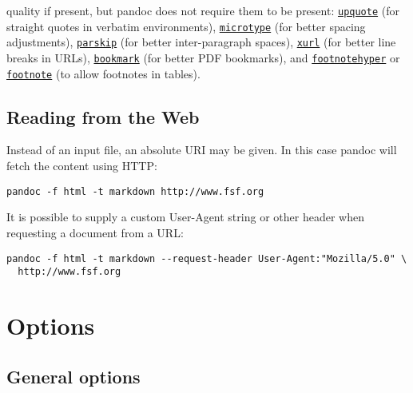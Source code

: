 \documentclass[
]{article}
\begin{document}
quality if present, but pandoc does not require them to be present:
\href{https://ctan.org/pkg/upquote}{\texttt{upquote}} (for straight
quotes in verbatim environments),
\href{https://ctan.org/pkg/microtype}{\texttt{microtype}} (for better
spacing adjustments),
\href{https://ctan.org/pkg/parskip}{\texttt{parskip}} (for better
inter-paragraph spaces), \href{https://ctan.org/pkg/xurl}{\texttt{xurl}}
(for better line breaks in URLs),
\href{https://ctan.org/pkg/bookmark}{\texttt{bookmark}} (for better PDF
bookmarks), and
\href{https://ctan.org/pkg/footnotehyper}{\texttt{footnotehyper}} or
\href{https://ctan.org/pkg/footnote}{\texttt{footnote}} (to allow
footnotes in tables).

\hypertarget{reading-from-the-web}{%
\subsection{Reading from the Web}\label{reading-from-the-web}}

Instead of an input file, an absolute URI may be given. In this case
pandoc will fetch the content using HTTP:

\begin{verbatim}
pandoc -f html -t markdown http://www.fsf.org
\end{verbatim}

It is possible to supply a custom User-Agent string or other header when
requesting a document from a URL:

\begin{verbatim}
pandoc -f html -t markdown --request-header User-Agent:"Mozilla/5.0" \
  http://www.fsf.org
\end{verbatim}

\hypertarget{options}{%
\section{Options}\label{options}}

\hypertarget{general-options}{%
\subsection{General options}\label{general-options}}
\end{document}
